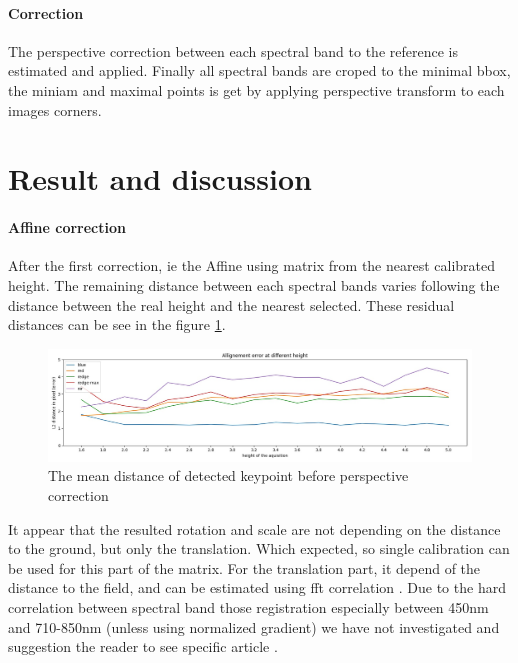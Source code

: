 \documentclass[]{elsarticle}
\begin{document}
	\paragraph{Correction}
	The perspective correction between each spectral band to the reference is estimated and applied.
	Finally all spectral bands are croped to the minimal bbox,
	the miniam and maximal points is get by applying perspective transform to each images corners.
	
	\section{Result and discussion}
	
	\paragraph{Affine correction} After the first correction, ie the Affine using matrix from the nearest calibrated height.
	The remaining distance between each spectral bands varies following the distance between the real height and the nearest selected.
	These residual distances can be see in the figure \ref{fig:affine-error}.
	
	\begin{figure}[!htb]
		\centering
		\includegraphics[width=\linewidth]{../figures/affine-allignement-rmse.jpg}
		\caption{The mean distance of detected keypoint before perspective correction}
		\label{fig:affine-error}
	\end{figure}
	
	It appear that the resulted rotation and scale are not depending on the distance to the ground, but only the translation.
	Which expected, so single calibration can be used for this part of the matrix.
	For the translation part, it depend of the distance to the field, and can be estimated using fft correlation \cite{506761}.
	Due to the hard correlation between spectral band those registration especially between 450nm and 710-850nm (unless using normalized gradient)
	we have not investigated and suggestion the reader to see specific article \cite{rabatel:hal-01684135}.
	
\end{document}
